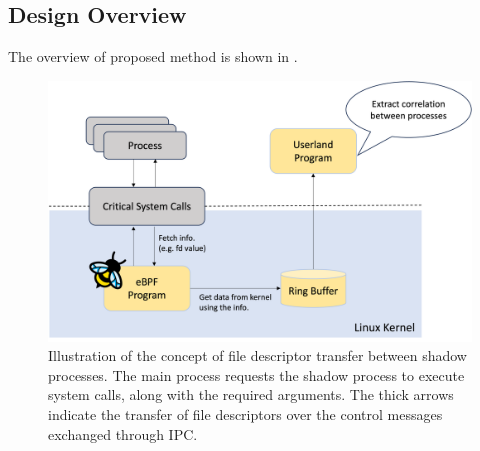 \subsection{Design Overview}
The overview of proposed method is shown in .
\begin{figure}[t]
  \begin{center}
    \includegraphics[width=\columnwidth]{./img/proposal_overview.png}
  \end{center}
  \caption{Illustration of the concept of file descriptor transfer between shadow processes.
    The main process requests the shadow process to execute system calls, along with the required arguments.
    The thick arrows indicate the transfer of file descriptors over the control messages exchanged through IPC.}
  \label{img:proposal-overview}
\end{figure}

